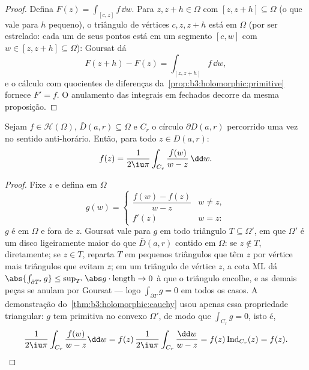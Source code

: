 \begin{proof}
Defina $F(z) = \int_{[c,z]}f\,\dd w$. Para $z, z + h \in
\Omega$ com $[z, z+h] \subseteq \Omega$ (o que vale para $h$ pequeno), o
triângulo de vértices $c, z, z+h$ está em $\Omega$ (por ser estrelado:
cada um de seus pontos está em um segmento $[c,
w]$ com $w \in [z, z+h] \subseteq \Omega$):
Goursat dá
\[
F(z + h) - F(z) = \int_{[z, z+h]}f\,\dd w,
\]
e o cálculo com quocientes de diferenças da~\cref{prop:b3:holomorphic:primitive} fornece
$F' = f$. O anulamento das integrais em  fechados decorre da
mesma proposição.
\end{proof}

\begin{theorem}
\label{thm:b3:holomorphic:formula}
Sejam $f \in \mathcal H(\Omega)$, $\bar D(a, r) \subseteq
\Omega$ e $C_r$ o círculo $\partial D(a,r)$ percorrido uma vez no
sentido anti-horário. Então, para todo $z \in D(a, r)$:
\[
f(z) = \frac1{2\iu\pi}\int_{C_r}\frac{f(w)}{w - z}\,\dd w .
\]
\end{theorem}

\begin{proof}
Fixe $z$ e defina em $\Omega$
\[
g(w) = \begin{cases}
\dfrac{f(w) - f(z)}{w - z} & w \neq z,\\[4pt]
f'(z) & w = z :
\end{cases}
\]
$g$ é  em $\Omega$ e  fora de $z$. Goursat
vale para $g$ em todo triângulo $T \subseteq \Omega'$, em que $\Omega'$ é um disco
ligeiramente maior do que $\bar D(a,r)$ contido em $\Omega$: se $z \notin T$,
diretamente; se $z \in T$, reparta $T$ em pequenos triângulos que têm
$z$ por vértice mais triângulos que evitam $z$; em um triângulo
de vértice $z$, a cota ML dá $\abs{\int_{\partial T'}g} \leq \sup_{T'}\abs
g\cdot\operatorname{length} \to 0$ à  que o triângulo encolhe,
e as demais peças se anulam por Goursat --- logo $\int_{\partial T}g = 0$ em todos os
casos. A demonstração do~\cref{thm:b3:holomorphic:cauchy} usou apenas essa propriedade
triangular: $g$ tem primitiva no convexo $\Omega'$, de modo que $\int_{C_r}g = 0$,
isto é,
\[
\frac1{2\iu\pi}\int_{C_r}\frac{f(w)}{w - z}\dd w
= f(z)\,\frac{1}{2\iu\pi}\int_{C_r}\frac{\dd w}{w - z}
= f(z)\operatorname{Ind}_{C_r}(z) = f(z) .
\]
\end{proof}

